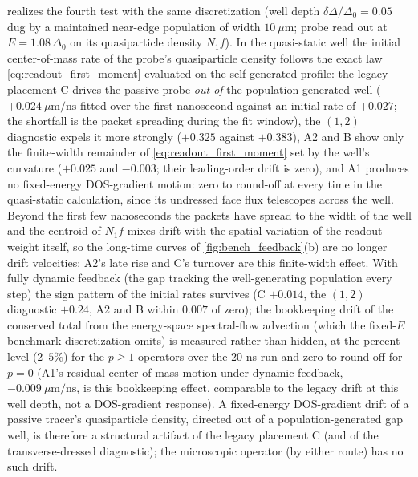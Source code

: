 \documentclass[
  aps,
  prb,
  preprint,
  superscriptaddress,
  longbibliography,
  nofootinbib
]{revtex4-2}
\newcommand{\DOS}{N_1}
\begin{document}
 realizes the fourth test with the same
discretization (well depth \(\delta\Delta/\Delta_0=0.05\) dug by a
maintained near-edge population of width \(10~\mu\mathrm{m}\); probe read
out at \(E=1.08\,\Delta_0\) on its quasiparticle density \(\DOS f\)). In
the quasi-static well the initial center-of-mass rate of the probe's
quasiparticle density follows the exact law
\cref{eq:readout_first_moment} evaluated on the self-generated profile:
the legacy placement C drives the passive probe \emph{out of} the
population-generated well (\(+0.024~\mu\mathrm{m}/\mathrm{ns}\) fitted
over the first nanosecond against an initial rate of \(+0.027\); the
shortfall is the packet spreading during the fit window), the \((1,2)\)
diagnostic expels it more strongly (\(+0.325\) against \(+0.383\)), A2
and B show only the finite-width remainder of
\cref{eq:readout_first_moment} set by the well's curvature (\(+0.025\)
and \(-0.003\); their leading-order drift is zero), and A1 produces no
fixed-energy DOS-gradient motion: zero to round-off at every time in the
quasi-static calculation, since its undressed face flux telescopes across
the well. Beyond the first few nanoseconds the packets have spread to the
width of the well and the centroid of \(\DOS f\) mixes drift with the
spatial variation of the readout weight itself, so the long-time curves
of \cref{fig:bench_feedback}(b) are no longer drift velocities; A2's late
rise and C's turnover are this finite-width effect. With fully dynamic
feedback (the gap tracking the well-generating population every step)
the sign pattern of the initial rates survives (C \(+0.014\), the
\((1,2)\) diagnostic \(+0.24\), A2 and B within \(0.007\) of zero); the
bookkeeping drift of the conserved total from the energy-space
spectral-flow advection (which the fixed-\(E\) benchmark discretization
omits) is measured rather than hidden, at the percent level
(\(2\)--\(5\%\)) for the \(p\geq1\) operators over the \(20\)-ns run and
zero to round-off for \(p=0\) (A1's residual center-of-mass motion under
dynamic feedback, \(-0.009~\mu\mathrm{m}/\mathrm{ns}\), is this
bookkeeping effect, comparable to the legacy drift at this well depth,
not a DOS-gradient response).
A fixed-energy DOS-gradient drift of a passive tracer's quasiparticle
density, directed out of a population-generated gap well, is therefore a
structural artifact of the legacy placement C (and of the
transverse-dressed diagnostic); the microscopic operator (by either
route) has no such drift.
\end{document}
